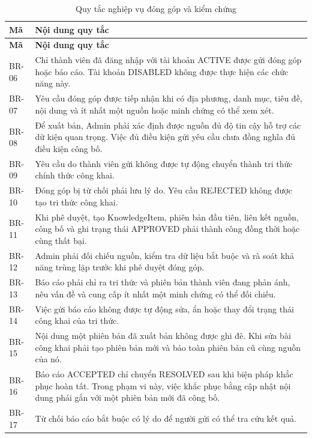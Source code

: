 \begin{longtable}{|L{20mm}|L{124mm}|}
\caption{Quy tắc nghiệp vụ đóng góp và kiểm chứng}\label{tab:chapter3-br-6}\\\hline
{}\textbf{Mã} & \textbf{Nội dung quy tắc}\\\hline
\endfirsthead
\hline
{}\textbf{Mã} & \textbf{Nội dung quy tắc}\\\hline
\endhead
\endfoot
BR-06 & Chỉ thành viên đã đăng nhập với tài khoản ACTIVE được gửi đóng góp hoặc báo cáo. Tài khoản DISABLED không được thực hiện các chức năng này.\\\hline
BR-07 & Yêu cầu đóng góp được tiếp nhận khi có địa phương, danh mục, tiêu đề, nội dung và ít nhất một nguồn hoặc minh chứng có thể xem xét.\\\hline
BR-08 & Để xuất bản, Admin phải xác định được nguồn đủ độ tin cậy hỗ trợ các dữ kiện quan trọng. Việc đủ điều kiện gửi yêu cầu chưa đồng nghĩa đủ điều kiện công bố.\\\hline
BR-09 & Yêu cầu do thành viên gửi không được tự động chuyển thành tri thức chính thức công khai.\\\hline
BR-10 & Đóng góp bị từ chối phải lưu lý do. Yêu cầu REJECTED không được tạo tri thức công khai.\\\hline
BR-11 & Khi phê duyệt, tạo KnowledgeItem, phiên bản đầu tiên, liên kết nguồn, công bố và ghi trạng thái APPROVED phải thành công đồng thời hoặc cùng thất bại.\\\hline
BR-12 & Admin phải đối chiếu nguồn, kiểm tra dữ liệu bắt buộc và rà soát khả năng trùng lặp trước khi phê duyệt đóng góp.\\\hline
BR-13 & Báo cáo phải chỉ ra tri thức và phiên bản thành viên đang phản ánh, nêu vấn đề và cung cấp ít nhất một minh chứng có thể đối chiếu.\\\hline
BR-14 & Việc gửi báo cáo không được tự động sửa, ẩn hoặc thay đổi trạng thái công khai của tri thức.\\\hline
BR-15 & Nội dung một phiên bản đã xuất bản không được ghi đè. Khi sửa bài công khai phải tạo phiên bản mới và bảo toàn phiên bản cũ cùng nguồn của nó.\\\hline
BR-16 & Báo cáo ACCEPTED chỉ chuyển RESOLVED sau khi biện pháp khắc phục hoàn tất. Trong phạm vi này, việc khắc phục bằng cập nhật nội dung phải gắn với một phiên bản mới đã công bố.\\\hline
BR-17 & Từ chối báo cáo bắt buộc có lý do để người gửi có thể tra cứu kết quả.\\\hline

\end{longtable}
